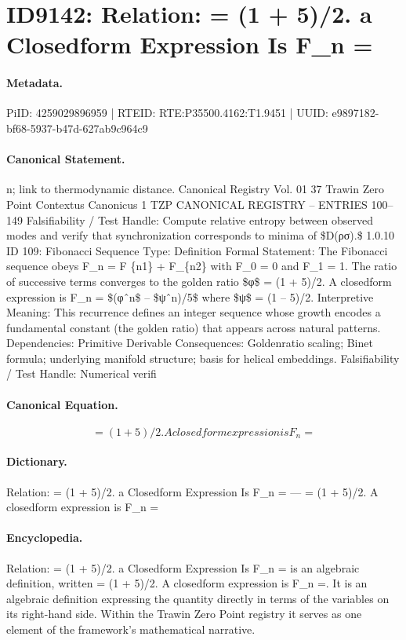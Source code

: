 \section*{ID9142: Relation: = (1 + 5)/2. a Closedform Expression Is F\_n =}
\paragraph{Metadata.}
PiID: 4259029896959 | RTEID: RTE:P35500.4162:T1.9451 | UUID: e9897182-bf68-5937-b47d-627ab9c964c9

\paragraph{Canonical Statement.}
n; link to thermodynamic distance. Canonical Registry Vol. 01 37 Trawin Zero Point Contextus Canonicus 1 TZP CANONICAL REGISTRY – ENTRIES 100–149 Falsifiability / Test Handle: Compute relative entropy between observed modes and verify that synchronization corresponds to minima of \$D(ρσ).\$ 1.0.10 ID 109: Fibonacci Sequence Type: Definition Formal Statement: The Fibonacci sequence obeys F\_n = F \{n1\} + F\_\{n2\} with F\_0 = 0 and F\_1 = 1. The ratio of successive terms converges to the golden ratio \$φ\$ = (1 + 5)/2. A closedform expression is F\_n = \$(φˆn\$ – \$ψˆn)/5\$ where \$ψ\$ = (1 – 5)/2. Interpretive Meaning: This recurrence defines an integer sequence whose growth encodes a fundamental constant (the golden ratio) that appears across natural patterns. Dependencies: Primitive Derivable Consequences: Goldenratio scaling; Binet formula; underlying manifold structure; basis for helical embeddings. Falsifiability / Test Handle: Numerical verifi

\paragraph{Canonical Equation.}
\[
= (1 + 5)/2. A closedform expression is F_n =
\]

\paragraph{Dictionary.}
Relation: = (1 + 5)/2. a Closedform Expression Is F\_n = — = (1 + 5)/2. A closedform expression is F\_n =

\paragraph{Encyclopedia.}
Relation: = (1 + 5)/2. a Closedform Expression Is F\_n = is an algebraic definition, written = (1 + 5)/2. A closedform expression is F\_n =. It is an algebraic definition expressing the quantity directly in terms of the variables on its right-hand side. Within the Trawin Zero Point registry it serves as one element of the framework's mathematical narrative.
